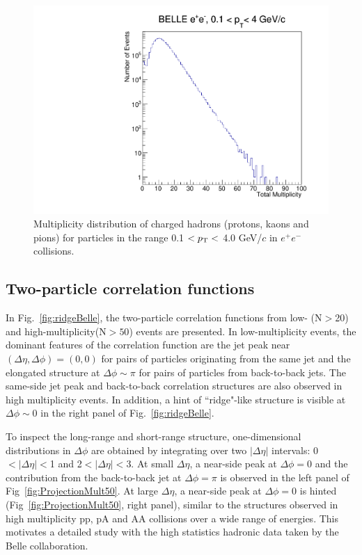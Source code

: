 \begin{figure}[!htb]
\begin{center}
\includegraphics[width=.45\textwidth]{figures/total_mult.pdf}
\caption{Multiplicity distribution of charged hadrons (protons, kaons and pions) for  particles in the range  0.1 $<p_{\rm T}<$ 4.0 GeV/$c$ in $e^{+}e^{-}$ collisions. }
\label{fig:multHadron} 
\end{center}
\end{figure}

\subsection{Two-particle correlation functions}


In Fig.~\ref{fig:ridgeBelle}, the two-particle correlation functions from low- (N$>$20) and high-multiplicity(N$>50$) events are presented. 
In low-multiplicity events, the dominant features of the correlation function are the jet peak near $(\Delta\eta,\Delta\phi)=(0,0)$ for pairs of particles originating from the same jet 
and the elongated structure at $\Delta\phi\sim\pi$ for pairs of particles from back-to-back jets. %
The same-side jet peak and back-to-back correlation structures are also observed in high multiplicity events. 
In addition, a hint of ``ridge"-like structure is visible at $\Delta\phi \sim$0 in the right panel of Fig.~\ref{fig:ridgeBelle}. 

To inspect the long-range and short-range structure, one-dimensional distributions in $\Delta\phi$ are obtained by integrating over two $|\Delta\eta|$ intervals: 0$<|\Delta \eta|<$1 and 
2$<|\Delta \eta|<$3.  At small $\Delta\eta$, a near-side peak at $\Delta\phi=$0 and the contribution from the back-to-back jet at $\Delta\phi=\pi$ is observed in the left panel of Fig~\ref{fig:ProjectionMult50}. At large $\Delta\eta$, a near-side peak at $\Delta\phi=0$ is hinted (Fig~\ref{fig:ProjectionMult50}, right panel), similar to the structures observed in high multiplicity pp, pA and AA collisions over a wide range of energies. This motivates a detailed study with the high statistics hadronic data taken by the Belle collaboration. 

